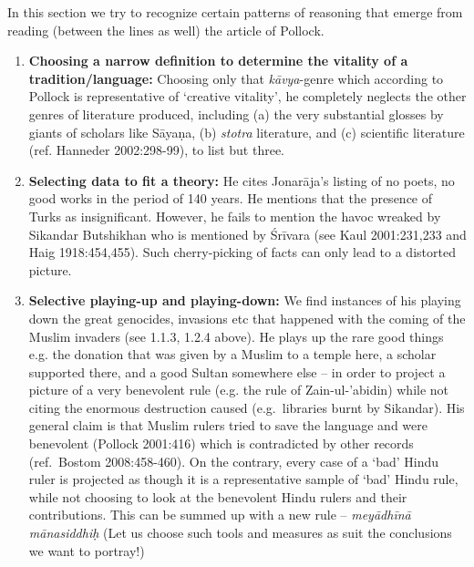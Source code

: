 In this section we try to recognize certain patterns of reasoning that emerge from reading (between the lines as well) the article of Pollock.
\begin{enumerate}
\item {\bf Choosing a narrow definition to determine the vitality of a tradition/language:} Choosing only that {\sl kāvya}-genre which according to Pollock is representative of ‘creative vitality’, he completely neglects the other genres of literature produced, including (a) the very substantial glosses by giants of scholars like Sāyaṇa, (b) {\sl stotra} literature, and (c) scientific literature (ref. Hanneder 2002:298-99), to list but three.
\item {\bf Selecting data to fit a theory:} He cites Jonarāja’s listing of no poets, no good works in the period of 140 years. He mentions that the presence of Turks as insignificant. However, he fails to mention the havoc wreaked by Sikandar Butshikhan who is mentioned by Śrīvara (see Kaul 2001:231,233 and Haig 1918:454,455). Such cherry-picking of facts can only lead to a distorted picture.
\item {\bf Selective playing-up and playing-down:} We find instances of his playing down the great genocides, invasions etc that happened with the coming of the Muslim invaders (see 1.1.3, 1.2.4 above). He plays up the rare good things  e.g. the donation that was given by a Muslim to a temple here, a scholar supported there, and a good Sultan somewhere else – in order to project a picture of a very benevolent rule (e.g. the rule of Zain-ul-'abidin) while not citing the enormous destruction caused (e.g.\ libraries burnt by Sikandar). His general claim is that Muslim rulers tried to save the language and were benevolent (Pollock 2001:416) which is contradicted by other records (ref.\ Bostom 2008:458-460). On the contrary, every case of a ‘bad’ Hindu ruler is projected as though it is a representative sample of ‘bad’ Hindu rule, while not choosing to look at the benevolent Hindu rulers and their contributions. This can be summed up with a new rule – {\sl meyādhīnā mānasiddhiḥ} (Let us choose such tools and measures as suit the conclusions we want to portray!)

\end{enumerate}
